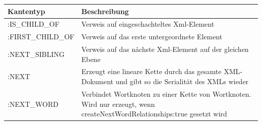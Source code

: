 \documentclass[ngerman,]{scrreprt}
\begin{document}
\begin{longtable}[]{@{}ll@{}}
\toprule
\begin{minipage}[b]{0.13\columnwidth}\raggedright\strut
Kantentyp\strut
\end{minipage} & \begin{minipage}[b]{0.17\columnwidth}\raggedright\strut
Beschreibung\strut
\end{minipage}\tabularnewline
\midrule
\endhead
\begin{minipage}[t]{0.13\columnwidth}\raggedright\strut
:IS\_CHILD\_OF\strut
\end{minipage} & \begin{minipage}[t]{0.17\columnwidth}\raggedright\strut
Verweis auf eingeschachteltes Xml-Element\strut
\end{minipage}\tabularnewline
\begin{minipage}[t]{0.13\columnwidth}\raggedright\strut
:FIRST\_CHILD\_OF\strut
\end{minipage} & \begin{minipage}[t]{0.17\columnwidth}\raggedright\strut
Verweis auf das erste untergeordnete Element\strut
\end{minipage}\tabularnewline
\begin{minipage}[t]{0.13\columnwidth}\raggedright\strut
:NEXT\_SIBLING\strut
\end{minipage} & \begin{minipage}[t]{0.17\columnwidth}\raggedright\strut
Verweis auf das nächste Xml-Element auf der gleichen Ebene\strut
\end{minipage}\tabularnewline
\begin{minipage}[t]{0.13\columnwidth}\raggedright\strut
:NEXT\strut
\end{minipage} & \begin{minipage}[t]{0.17\columnwidth}\raggedright\strut
Erzeugt eine lineare Kette durch das gesamte XML-Dokument und gibt so die Serialität des XMLs wieder\strut
\end{minipage}\tabularnewline
\begin{minipage}[t]{0.13\columnwidth}\raggedright\strut
:NEXT\_WORD\strut
\end{minipage} & \begin{minipage}[t]{0.17\columnwidth}\raggedright\strut
Verbindet Wortknoten zu einer Kette von Wortknoten. Wird nur erzeugt, wenn createNextWordRelationships:true gesetzt wird\strut
\end{minipage}\tabularnewline
\bottomrule
\end{longtable}
\end{document}
